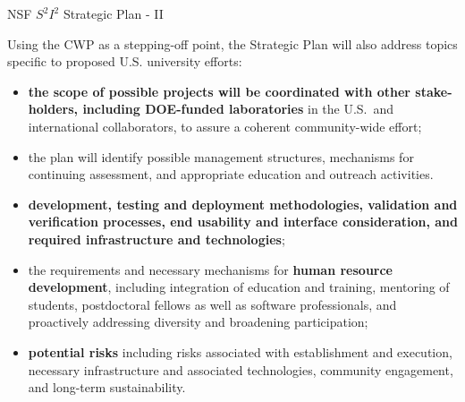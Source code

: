 \documentclass[compress,10]{beamer}
\begin{document}
\begin{frame}[fragile]{NSF $S^2 I^2 $ Strategic Plan - II }{}
{\footnotesize
Using the CWP as a stepping-off point, the Strategic Plan will also address
topics specific to proposed U.S. university efforts:
\begin{itemize}
 \item
  \textcolor{brickred}{\bf
  the scope of possible projects will be coordinated with
  other stake-holders, including DOE-funded laboratories}
  in the U.S.\ and international collaborators,
  to assure a coherent community-wide effort;
 \item
  the plan will identify possible management structures,
  mechanisms for continuing assessment,
  and appropriate education and outreach activities.
 \item
  \textcolor{brickred}{\bf
   development, testing and deployment
   methodologies, validation and verification processes,
   end usability and interface consideration,
   and required infrastructure and technologies};
 \item
   the requirements and necessary mechanisms for 
  \textcolor{brickred}{\bf human resource development},
   including integration
   of education and training, mentoring of students, postdoctoral fellows
   as well as
   software professionals, and proactively addressing diversity and
   broadening participation;
 \item
   \textcolor{brickred}{\bf
    potential risks} including risks associated with establishment and
   execution, necessary infrastructure
   and associated technologies, community engagement, and long-term
   sustainability.
\end{itemize}
}  %

\end{frame}
\end{document}
